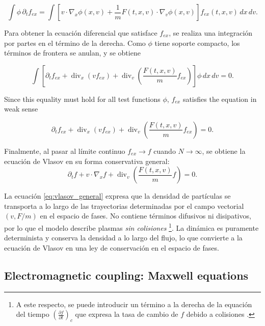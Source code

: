\documentclass[11pt,a4paper,twoside,pdf]{article}
\numberwithin{equation}{section}
\begin{document}
\[
\int \phi\,\partial_t f_{ex}
= \int \left[
v\cdot\nabla_x\phi(x,v)
+ \frac{1}{m}F(t,x,v)\cdot\nabla_v\phi(x,v)
\right] f_{ex}(t,x,v)\,dx\,dv.
\]



\medskip

Para obtener la ecuación diferencial que satisface $f_{ex}$, se realiza una
integración por partes en el término de la derecha. Como $\phi$ tiene soporte
compacto, los términos de frontera se anulan, y se obtiene


\[
\int \left[
\partial_t f_{ex}
+ \operatorname{div}_x(v f_{ex})
+ \operatorname{div}_v\!\left(\frac{F(t,x,v)}{m} f_{ex}\right)
\right]\phi\,dx\,dv = 0.
\]



Since this equality must hold for all test functions $\phi$, $f_{ex}$ satisfies the equation in weak sense


\[
\partial_t f_{ex}
+ \operatorname{div}_x(v f_{ex})
+ \operatorname{div}_v\!\left(\frac{F(t,x,v)}{m} f_{ex}\right)=0.
\]



Finalmente, al pasar al límite continuo $f_{ex}\to f$ cuando $N\to\infty$, se obtiene
la ecuación de Vlasov en su forma conservativa general:
\begin{equation}
\partial_t f + v\cdot\nabla_x f
+ \operatorname{div}_v\!\left(\frac{F(t,x,v)}{m}f\right)=0.
\label{eq:vlasov_general}
\end{equation}

\medskip


La ecuación \eqref{eq:vlasov_general} expresa que la densidad de partículas se
transporta a lo largo de las trayectorias determinadas por el campo vectorial
$(v,F/m)$ en el espacio de fases. No contiene términos difusivos ni disipativos,
por lo que el modelo describe plasmas \emph{sin colisiones} \footnote{A este respecto, se puede introducir un término a la derecha de la equación del tiempo $\left( \frac{\partial f}{\partial t} \right)_c$ que expresa la tasa de cambio de $f$ debido a colisiones \cite{chen1984introduction}.}. La dinámica es
puramente determinista y conserva la densidad a lo largo del flujo, lo que convierte
a la ecuación de Vlasov en una ley de conservación en el espacio de fases.




\subsection{Electromagnetic coupling: Maxwell equations}
\end{document}
